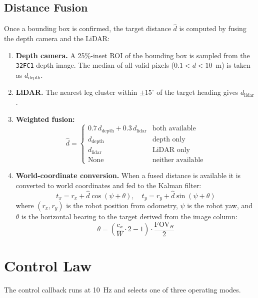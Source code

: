 \documentclass[12pt,a4paper]{article}
\begin{document}
\subsection{Distance Fusion}

Once a bounding box is confirmed, the target distance $\hat{d}$ is computed
by fusing the depth camera and the LiDAR:

\begin{enumerate}
  \item \textbf{Depth camera.} A 25\%-inset ROI of the bounding box is
    sampled from the \texttt{32FC1} depth image.  The median of all valid
    pixels ($0.1 < d < 10$~m) is taken as $d_\text{depth}$.

  \item \textbf{LiDAR.} The nearest leg cluster within $\pm15^{\circ}$ of the
    target heading gives $d_\text{lidar}$.

  \item \textbf{Weighted fusion:}
    \[
      \hat{d} = \begin{cases}
        0.7\,d_\text{depth} + 0.3\,d_\text{lidar} & \text{both available} \\
        d_\text{depth} & \text{depth only} \\
        d_\text{lidar} & \text{LiDAR only} \\
        \text{None}    & \text{neither available}
      \end{cases}
    \]

  \item \textbf{World-coordinate conversion.} When a fused distance is
    available it is converted to world coordinates and fed to the Kalman
    filter:
    \[
      t_x = r_x + \hat{d}\cos(\psi + \theta), \quad
      t_y = r_y + \hat{d}\sin(\psi + \theta)
    \]
    where $(r_x,r_y)$ is the robot position from odometry, $\psi$ is the
    robot yaw, and $\theta$ is the horizontal bearing to the target derived
    from the image column:
    \[
      \theta = \left(\frac{c_x}{W} \cdot 2 - 1\right) \cdot \frac{\text{FOV}_H}{2}
    \]
\end{enumerate}

\section{Control Law}

The control callback runs at 10~Hz and selects one of three operating modes.
\end{document}
